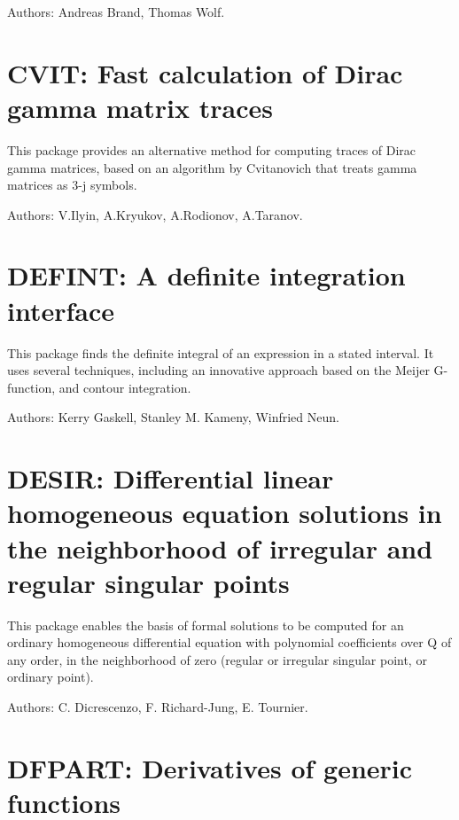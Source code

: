 Authors: Andreas Brand, Thomas Wolf.

\newpage

\section{CVIT: Fast calculation of Dirac gamma matrix traces}
\label{CVIT}

This package provides an alternative method for computing traces of Dirac
gamma matrices, based on an algorithm by Cvitanovich that treats gamma
matrices as 3-j symbols.

Authors: V.Ilyin, A.Kryukov, A.Rodionov, A.Taranov.


\newpage

\section{DEFINT: A definite integration interface}
\label{DEFINT}

This package finds the definite integral of an expression in a stated
interval.  It uses several techniques, including an innovative approach
based on the Meijer G-function, and contour integration.

Authors: Kerry Gaskell, Stanley M. Kameny, Winfried Neun.


\newpage

\section{DESIR: Differential linear homogeneous equation solutions in the
              neighborhood of irregular and regular singular points}

This package enables the basis of formal solutions to be computed for an
ordinary homogeneous differential equation with polynomial coefficients
over Q of any order, in the neighborhood of zero (regular or irregular
singular point, or ordinary point).

Authors: C. Dicrescenzo, F. Richard-Jung, E. Tournier.


\newpage

\section{DFPART: Derivatives of generic functions}

